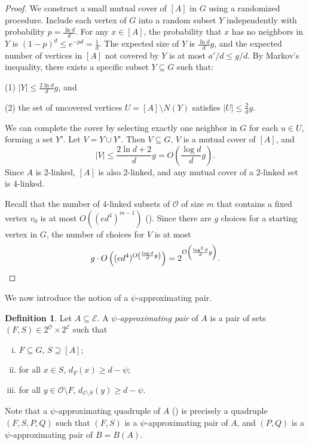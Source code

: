 \documentclass{amsart}
\theoremstyle{definition}
\newtheorem{mydef}[thm]{Definition}
\newcommand{\cO}{\mathcal{O} }
\newcommand{\cE}{\mathcal{E} }
\newcommand{\0}[0]{\emptyset}
\begin{document}
\begin{proof} We construct a small mutual cover of $[A]$ in $G$ using a randomized procedure. Include each vertex of $G$ into a random subset $Y$ independently with probability $p = \frac{\ln d}{d}$. For any $x \in [A]$, the probability that $x$ has no neighbors in $Y$ is $(1-p)^d \le e^{-pd} = \frac{1}{d}$. The expected size of $Y$ is $\frac{\ln d}{d}g$, and the expected number of vertices in $[A]$ not covered by $Y$ is at most $a'/d \le g/d$. By Markov's inequality, there exists a specific subset $Y \subseteq G$ such that:

(1) $|Y| \le \frac{2 \ln d}{d}g$, and 

(2) the set of uncovered vertices $U = [A] \setminus N(Y)$ satisfies $|U| \le \frac{2}{d}g$. 

We can complete the cover by selecting exactly one neighbor in $G$ for each $u \in U$, forming a set $Y'$. Let $V = Y \cup Y'$. Then $V \subseteq G$, $V$ is a mutual cover of $[A]$, and$$|V| \le \frac{2 \ln d + 2}{d} g = O\left( \frac{\log d}{d} g \right).$$Since $A$ is 2-linked, $[A]$ is also 2-linked, and any mutual cover of a 2-linked set is 4-linked. 


Recall that the number of 4-linked subsets of $\mathcal{O}$ of size $m$ that contains a fixed vertex $v_0$ is at most $O((ed^4)^{m-1})$ ().  Since there are $g$ choices for a starting vertex in $G$, the number of choices for $V$ is at most
\[
g\cdot O\left((ed^4)^{O\left( \frac{\log d}{d} g \right)}\right)=2^{O\left( \frac{\log^2 d}{d} g \right)}. \qedhere
\]
\end{proof}

We now introduce the notion of a $\psi$-approximating pair. 

\begin{mydef}\label{def:psi-approx}
    Let $A\subseteq \cE$. A \textit{$\psi$-approximating pair} of $A$ is a pair of sets $(F,S)\in 2^{\cO}\times 2^{\cE}$ such that
        \begin{enumerate}[(i)]
        \item $F\subseteq G$, $S\supseteq [A]$;
        \item for all $x\in S$, $d_F(x)\geq d-\psi$;
        \item for all $y\in \cO\setminus F$, $d_{\cE\setminus S}(y)\geq d-\psi$.
    \end{enumerate}
\end{mydef}

Note that a $\psi$-approximating quadruple of $A$ () 
is precisely a quadruple $(F,S,P,Q)$ such that $(F,S)$ is a $\psi$-approximating 
pair of $A$, and $(P,Q)$ is a $\psi$-approximating pair of $B=B(A)$.
\end{document}
